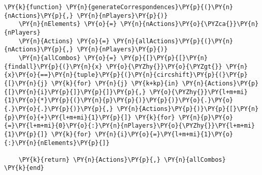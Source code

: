 \documentclass[main.tex]{subfiles}
\begin{document}
    \begin{tcolorbox}[breakable, size=fbox, boxrule=1pt, pad at break*=1mm,colback=cellbackground, colframe=cellborder]
\begin{Verbatim}[commandchars=\\\{\}]
\PY{k}{function} \PY{n}{generateCorrespondences}\PY{p}{(}\PY{n}{nActions}\PY{p}{,} \PY{n}{nPlayers}\PY{p}{)}
    \PY{n}{nElements} \PY{o}{=} \PY{n}{nActions}\PY{o}{\PYZca{}}\PY{n}{nPlayers}
    \PY{n}{Actions} \PY{o}{=} \PY{n}{allActions}\PY{p}{(}\PY{n}{nActions}\PY{p}{,} \PY{n}{nPlayers}\PY{p}{)}
    \PY{n}{allCombos} \PY{o}{=} \PY{p}{[}\PY{p}{[}\PY{n}{findall}\PY{p}{(}\PY{n}{x} \PY{o}{\PYZhy{}}\PY{o}{\PYZgt{}} \PY{n}{x}\PY{o}{==}\PY{n}{tuple}\PY{p}{(}\PY{n}{circshift}\PY{p}{(}\PY{p}{[}\PY{n}{j} \PY{k}{for} \PY{n}{j} \PY{k+kp}{in} \PY{n}{Actions}\PY{p}{[}\PY{n}{i}\PY{p}{]}\PY{p}{]}\PY{p}{,} \PY{o}{\PYZhy{}}\PY{l+m+mi}{1}\PY{o}{*}\PY{p}{(}\PY{n}{p}\PY{p}{)}\PY{p}{)}\PY{o}{.}\PY{o}{.}\PY{o}{.}\PY{p}{)}\PY{p}{,} \PY{n}{Actions}\PY{p}{)}\PY{p}{[}\PY{n}{p}\PY{o}{+}\PY{l+m+mi}{1}\PY{p}{]} \PY{k}{for} \PY{n}{p}\PY{o}{=}\PY{l+m+mi}{0}\PY{o}{:}\PY{n}{nPlayers}\PY{o}{\PYZhy{}}\PY{l+m+mi}{1}\PY{p}{]} \PY{k}{for} \PY{n}{i}\PY{o}{=}\PY{l+m+mi}{1}\PY{o}{:}\PY{n}{nElements}\PY{p}{]}
    
    \PY{k}{return} \PY{n}{Actions}\PY{p}{,} \PY{n}{allCombos}
\PY{k}{end}
\end{Verbatim}
\end{tcolorbox}
\end{document}
